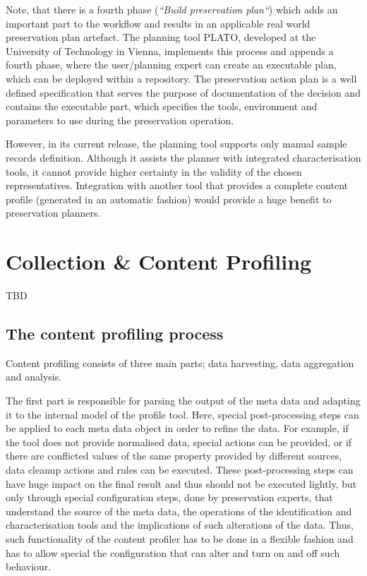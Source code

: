 Note, that there is a fourth phase (\textit{``Build preservation plan``}) which adds an important part to the workflow and results in an applicable real world preservation plan artefact. The planning tool PLATO, developed at the University of Technology in Vienna, implements this process and appends a fourth phase, where the user/planning expert can create an executable plan, which can be deployed within a repository. The preservation action plan is a well defined specification that serves the purpose of documentation of the decision and contains the executable part, which specifies the tools, environment and parameters to use during the preservation operation.

However, in its current release, the planning tool supports only manual sample records definition. Although it assists the planner with integrated characterisation tools, it cannot provide higher certainty in the validity of the chosen representatives. Integration with another tool that provides a complete content profile (generated in an automatic fashion) would provide a huge benefit to preservation planners.

\section{Collection \& Content Profiling}
\label{sec:content_profiling}
TBD
\subsection{The content profiling process}
Content profiling consists of three main parts; data harvesting, data aggregation and analysis.

The first part is responsible for parsing the output of the meta data and adapting it to the internal model of the profile tool. Here, special post-processing steps can be applied to each meta data object in order to refine the data. For example, if the tool does not provide normalised data, special actions can be provided, or if there are conflicted values of the same property provided by different sources, data cleanup actions and rules can be executed. These post-processing steps can have huge impact on the final result and thus should not be executed lightly, but only through special configuration steps, done by preservation experts, that understand the source of the meta data, the operations of the identification and characterisation tools and the implications of such alterations of the data. Thus, such functionality of the content profiler has to be done in a flexible fashion and has to allow special the configuration that can alter and turn on and off such behaviour.

